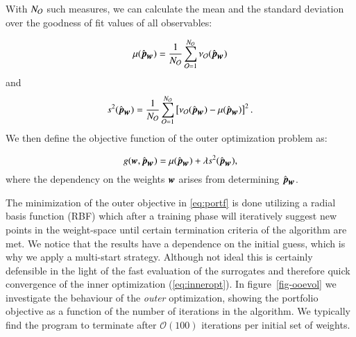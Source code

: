 With $N_{\mathcal{O}}$ such measures, we can calculate the mean and the standard deviation over the goodness of fit values of all observables:

\begin{equation} 
 \mu(\hat{\mbox{\boldmath $ p $}}_{\mbox{\boldmath $ w $}}) = \frac{1}{N_{\mathcal{O}}}\sum_{{\cal O}=1}^{N_{\mathcal{O}}} \nu_{\cal O}(\hat{\mbox{\boldmath $ p $}}_{\mbox{\boldmath $ w $}})
\end{equation}	
and
\begin{equation} 
s^2(\hat{\mbox{\boldmath $ p $}}_{\mbox{\boldmath $ w $}}) = \frac{1}{N_{\mathcal{O}}}\sum_{{\cal O}=1}^{N_{\mathcal{O}}} \left[\nu_{\cal O}(\hat{\mbox{\boldmath $ p $}}_{\mbox{\boldmath $ w $}}) -\mu(\hat{\mbox{\boldmath $ p $}}_{\mbox{\boldmath $ w $}})\right]^2.
\end{equation}	
We then define the objective function of the outer optimization problem as: 


\begin{equation}\label{eq:portf}
g(\mbox{\boldmath $ w $}, \hat{\mbox{\boldmath $ p $}}_{\mbox{\boldmath $ w $}}) = 
\mu(\hat{\mbox{\boldmath $ p $}}_{\mbox{\boldmath $ w $}}) +\lambda s^2(\hat{\mbox{\boldmath $ p $}}_{\mbox{\boldmath $ w $}}),
\end{equation}	
where the dependency on the weights $\mbox{\boldmath $ w $}$ arises from determining $\hat{\mbox{\boldmath $ p $}}_{\mbox{\boldmath $ w $}}$.

The minimization of the outer objective in \eqref{eq:portf} is done utilizing a radial basis function (RBF) which after a training phase will iteratively suggest new points in the weight-space until certain termination criteria of the algorithm are met. We notice that the results have a dependence on the initial guess, which is why we apply a multi-start strategy. Although not ideal this is certainly defensible in the light of the fast evaluation of the surrogates and therefore quick convergence of the inner optimization (\eqref{eq:inneropt}). In figure~\ref{fig-ooevol} we investigate the behaviour of the \emph{outer} optimization, showing the portfolio objective as a function of the number of iterations in the algorithm. We typically find the program to terminate after $\mathcal{O}(100)$ iterations per initial set of weights.

